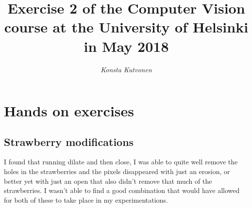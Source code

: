 \documentclass{article}
\begin{document}
\title{Exercise 2 of the Computer Vision course at the
  University of Helsinki in May 2018}

\author{\emph{Konsta Kutvonen}}
\maketitle


\newpage
\section{Hands on exercises}

\subsection{Strawberry modifications}

I found that running dilate and then close, I was able to quite well remove the holes in the strawberries and the pixels disappeared with just an erosion, or better yet with just an open that also didn't remove that much of the strawberries. I wasn't able to find a good combination that would have allowed for both of these to take place in my experimentations.

\newpage
\end{document}

